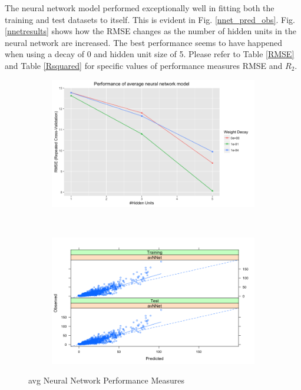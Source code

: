 \documentclass[letterpaper,12pt,titlepage,oneside,final]{report}
\begin{document}
            The neural network model performed exceptionally well in fitting both the training and test datasets to itself. This is evident in Fig. \ref{nnet_pred_obs}. Fig. \ref{nnetresults} shows how the RMSE changes as the number of hidden units in the neural network are increased. The best performance seems to have happened when using a decay of 0 and hidden unit size of 5. Please refer to Table \ref{RMSE} and Table \ref{Rsquared} for specific values of performance measures RMSE and $R_2$.
            \begin{figure}[!ht]
            \begin{subfigure}[t]{0.5\textwidth}
                \centering
                \includegraphics[width=1.1\textwidth]{avnnetresults}
                \caption{}
                \label{avnnetresults}
            \end{subfigure}%
                ~ 
            \begin{subfigure}[t]{0.5\textwidth}
                \centering
                \includegraphics[width=1.1\textwidth]{avnnet_pred_obs}
                \caption{}
                \label{avnnet_pred_obs}
            \end{subfigure}
            \caption{avg Neural Network Performance Measures}
            \end{figure}
\end{document}
